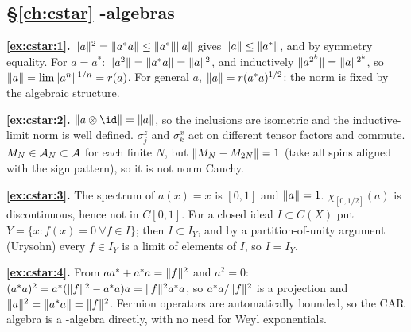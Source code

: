 {\subsection*{\S\ref{ch:cstar} \cstar-algebras}
\textbf{\ref{ex:cstar:1}.} $\lVert a\rVert^2=\lVert a^*a\rVert\le\lVert a^*\rVert\lVert a\rVert$ gives $\lVert a\rVert\le\lVert a^*\rVert$, and by symmetry equality. For $a=a^*$: $\lVert a^2\rVert=\lVert a^*a\rVert=\lVert a\rVert^2$, and inductively $\lVert a^{2^k}\rVert=\lVert a\rVert^{2^k}$, so $\lVert a\rVert=\lim\lVert a^n\rVert^{1/n}=r(a)$. For general $a$, $\lVert a\rVert=r(a^*a)^{1/2}$: the norm is fixed by the algebraic structure.\par
\textbf{\ref{ex:cstar:2}.} $\norm{a\otimes\id}=\norm a$, so the inclusions are isometric and the inductive-limit norm is well defined. $\sigma^z_j$ and $\sigma^x_k$ act on different tensor factors and commute. $M_N\in\mathcal{A}_N\subset\mathcal{A}$ for each finite $N$, but $\lVert M_N-M_{2N}\rVert=1$ (take all spins aligned with the sign pattern), so it is not norm Cauchy.\par
\textbf{\ref{ex:cstar:3}.} The spectrum of $a(x)=x$ is $[0,1]$ and $\lVert a\rVert=1$. $\chi_{[0,1/2]}(a)$ is discontinuous, hence not in $C[0,1]$. For a closed ideal $I\subset C(X)$ put $Y=\{x:f(x)=0\ \forall f\in I\}$; then $I\subset I_Y$, and by a partition-of-unity argument (Urysohn) every $f\in I_Y$ is a limit of elements of $I$, so $I=I_Y$.\par
\textbf{\ref{ex:cstar:4}.} From $aa^*+a^*a=\lVert f\rVert^2$ and $a^2=0$: $(a^*a)^2=a^*(\lVert f\rVert^2-a^*a)a=\lVert f\rVert^2a^*a$, so $a^*a/\lVert f\rVert^2$ is a projection and $\lVert a\rVert^2=\lVert a^*a\rVert=\lVert f\rVert^2$. Fermion operators are automatically bounded, so the CAR algebra is a \cstar-algebra directly, with no need for Weyl exponentials.\par

}
